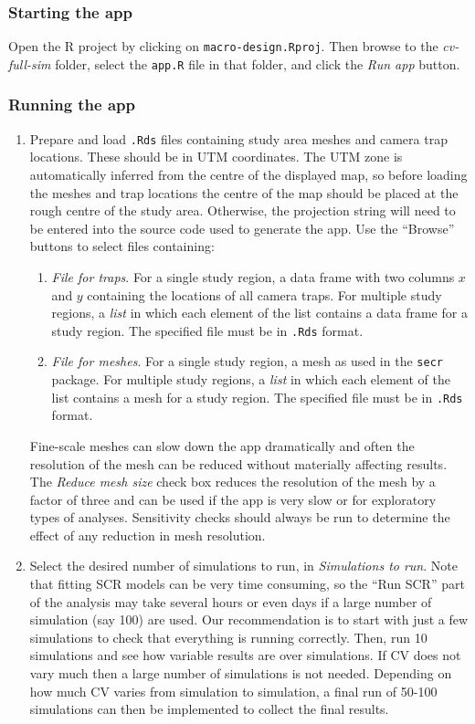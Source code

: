 \documentclass[a4paper,11pt, draft]{article} %
\begin{document}
\subsubsection{Starting the app}
Open the R project by clicking on \texttt{macro-design.Rproj}. Then browse to the \textit{cv-full-sim} folder, select the \texttt{app.R} file in that folder, and click the \textit{Run app} button. 

\subsubsection{Running the app}

\begin{enumerate}
\item Prepare and load \texttt{.Rds} files containing study area meshes and camera trap locations. These should be in UTM coordinates. The UTM zone is automatically inferred from the centre of the displayed map, so before loading the meshes and trap locations the centre of the map should be placed at the rough centre of the study area. Otherwise, the projection string will need to be entered into the source code used to generate the app. Use the ``Browse'' buttons to select files containing:
\begin{enumerate}
\item \textit{File for traps}. For a single study region, a data frame with two columns $x$ and $y$ containing the locations of all camera traps. For multiple study regions, a {\it list} in which each element of the list contains a data frame for a study region. The specified file must be in \texttt{.Rds} format.
\item \textit{File for meshes}. For a single study region, a mesh as used in the \texttt{secr} package. For multiple study regions, a {\it list} in which each element of the list contains a mesh for a study region. The specified file must be in \texttt{.Rds} format.
\end{enumerate}
Fine-scale meshes can slow down the app dramatically and often the resolution of the mesh can be reduced without materially affecting results. The \textit{Reduce mesh size} check box reduces the resolution of the mesh by a factor of three and can be used if the app is very slow or for exploratory types of analyses. Sensitivity checks should always be run to determine the effect of any reduction in mesh resolution.
\item Select the desired number of simulations to run, in \textit{Simulations to run}. Note that fitting SCR models can be very time consuming, so the ``Run SCR'' part of the analysis may take several hours or even days if a large number of simulation (say 100) are used. Our recommendation is to start with just a few simulations to check that everything is running correctly. Then, run 10 simulations and see how variable results are over simulations. If CV does not vary much then a large number of simulations is not needed. Depending on how much CV varies from simulation to simulation, a final run of 50-100 simulations can then be implemented to collect the final results.

\end{enumerate}
\end{document}
